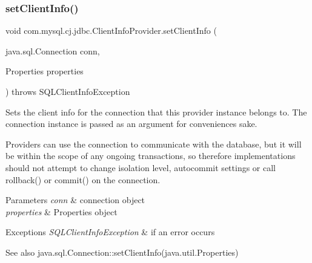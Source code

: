 \mbox{\label{interfacecom_1_1mysql_1_1cj_1_1jdbc_1_1_client_info_provider_aa6e19d37534651d9916fb45ea7392044}} 
\subsubsection{\texorpdfstring{set\+Client\+Info()}{setClientInfo()}\hspace{0.1cm}{\footnotesize\ttfamily [1/2]}}
{\footnotesize\ttfamily void com.\+mysql.\+cj.\+jdbc.\+Client\+Info\+Provider.\+set\+Client\+Info (\begin{DoxyParamCaption}\item[{java.\+sql.\+Connection}]{conn,  }\item[{Properties}]{properties }\end{DoxyParamCaption}) throws S\+Q\+L\+Client\+Info\+Exception}

Sets the client info for the connection that this provider instance belongs to. The connection instance is passed as an argument for convenience\textquotesingle{}s sake.

Providers can use the connection to communicate with the database, but it will be within the scope of any ongoing transactions, so therefore implementations should not attempt to change isolation level, autocommit settings or call rollback() or commit() on the connection.


\begin{DoxyParams}{Parameters}
{\em conn} & connection object \\
\hline
{\em properties} & Properties object \\
\hline
\end{DoxyParams}

\begin{DoxyExceptions}{Exceptions}
{\em S\+Q\+L\+Client\+Info\+Exception} & if an error occurs\\
\hline
\end{DoxyExceptions}
\begin{DoxySeeAlso}{See also}
java.\+sql.\+Connection\+::set\+Client\+Info(java.\+util.\+Properties) 
\end{DoxySeeAlso}


